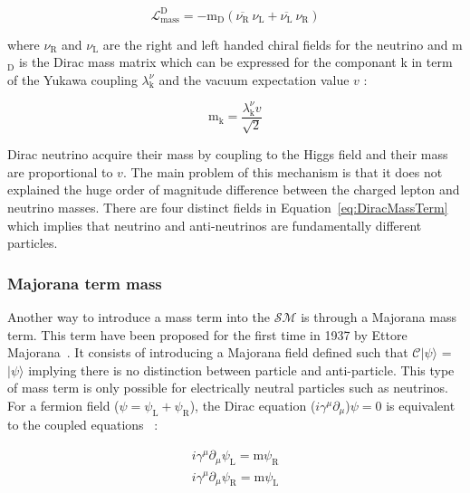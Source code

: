\documentclass[main.tex]{subfiles}
\begin{document}
\begin{equation}\label{eq:DiracMassTerm}
\mathcal{L}_{\text{mass}}^\text{D} = -\text{m}_\text{D} ( \overline{\nu_\text{R}}~\nu_\text{L} + \overline{\nu_\text{L}}~\nu_\text{R} ) 
\end{equation}


\smallskip


\NI where $\nu_{\text{R}}$ and $\nu_{\text{L}}$ are the right and left handed chiral fields for the neutrino and m$_\text{D}$ is the Dirac mass matrix which can be expressed for the componant k in term of the Yukawa coupling $\lambda_\text{k}^{\nu}$ and  the vacuum expectation value $v$ : 

\begin{equation}
\text{m}_\text{k} = \frac{\lambda_\text{k}^\nu v}{\sqrt{\text{2}}}
\end{equation}  


\smallskip


\NI Dirac neutrino acquire their mass by coupling to the Higgs field and their mass are proportional to $v$. The main problem of this mechanism is that it does not explained the huge order of magnitude difference between the charged lepton and neutrino masses. There are four distinct fields in Equation~\ref{eq:DiracMassTerm} which implies that neutrino and anti-neutrinos are fundamentally different particles.


\subsubsection{Majorana term mass}

\NI Another way to introduce a mass term into the $\mathcal{SM}$ is through a Majorana mass term. This term have been proposed for the first time in 1937 by Ettore Majorana~\cite{Majorana2008}. It consists of introducing a Majorana field defined such that $\mathcal{C}|\psi\rangle$ = $|\psi\rangle$ implying there is no distinction between particle and anti-particle. This type of mass term is only possible for electrically neutral particles such as neutrinos. For a fermion field ($\psi = \psi_\text{L} + \psi_\text{R}$), the Dirac equation ($i\gamma^\mu\partial_\mu$)$\psi = 0$ is equivalent to the coupled equations~\cite{WeylSpinorNeutrino} : 


\begin{gather}\label{eq:DiracEquations}
i\gamma^\mu\partial_\mu \psi_\text{L} = \text{m} \psi_\text{R} \nonumber\\[1.0ex]
i\gamma^\mu\partial_\mu \psi_\text{R} = \text{m} \psi_\text{L}
\end{gather}
\end{document}
